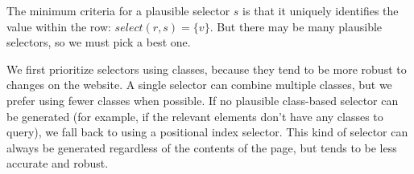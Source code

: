 \documentclass[sigconf,10pt]{acmart}
\begin{document}
The minimum criteria for a plausible selector \(s\) is that it uniquely
identifies the value within the row: \(select(r, s) = \{v\}\). But there
may be many plausible selectors, so we must pick a best one.

We first prioritize selectors using classes, because they tend to be
more robust to changes on the website. A single selector can combine
multiple classes, but we prefer using fewer classes when possible. If no
plausible class-based selector can be generated (for example, if the
relevant elements don't have any classes to query), we fall back to
using a positional index selector. This kind of selector can always be
generated regardless of the contents of the page, but tends to be less
accurate and robust.
\end{document}
